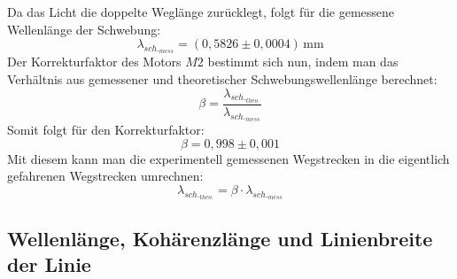 Da das Licht die doppelte Weglänge zurücklegt, folgt für die gemessene Wellenlänge der Schwebung:
\begin{equation}
    \lambda_{{sch.}_{mess}}=\left(0,5826\pm0,0004\right)\,\text{mm}
\end{equation}
Der Korrekturfaktor des Motors $M2$ bestimmt sich nun, indem man das Verhältnis aus gemessener und theoretischer Schwebungswellenlänge berechnet:
\begin{equation}
    \beta=\frac{\lambda_{{sch.}_{theo.}}}{\lambda_{{sch.}_{mess}}}
\end{equation}
Somit folgt für den Korrekturfaktor:
\begin{equation}
    \beta=0,998\pm0,001
\end{equation}
Mit diesem kann man die experimentell gemessenen Wegstrecken in die eigentlich gefahrenen Wegstrecken umrechnen:
\begin{equation}
    \lambda_{{sch.}_{theo.}}=\beta\cdot\lambda_{{sch.}_{mess}}
\end{equation}
\subsection{Wellenlänge, Kohärenzlänge und Linienbreite der Linie}
